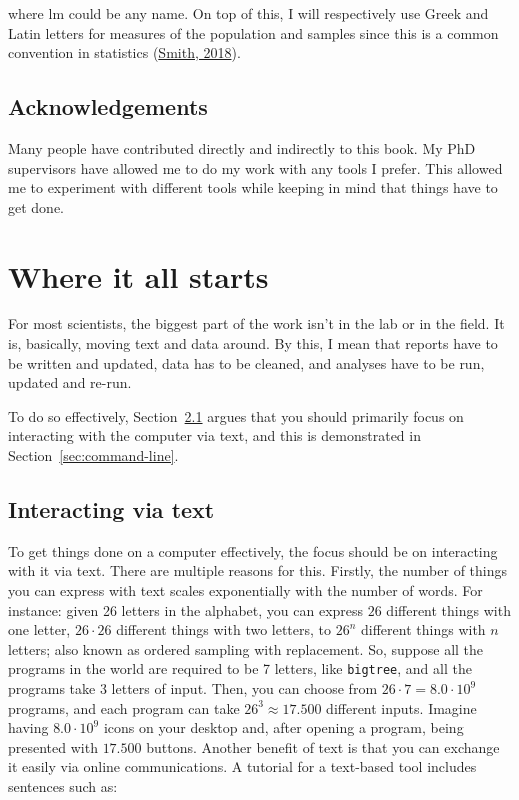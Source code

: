 \documentclass[
  14pt
  american,
  paper=a4,
  ,captions=tableheading
]{scrbook}
\newcommand{\passthrough}[1]{#1}
\begin{document}
where \(\text{lm}\) could be any name. On top of this, I will
respectively use Greek and Latin letters for measures of the population
and samples since this is a common convention in statistics
(\protect\hyperlink{ref-smith2018mathematical}{Smith, 2018}).

\hypertarget{acknowledgements}{%
\section{Acknowledgements}\label{acknowledgements}}

Many people have contributed directly and indirectly to this book. My
PhD supervisors have allowed me to do my work with any tools I prefer.
This allowed me to experiment with different tools while keeping in mind
that things have to get done.

\hypertarget{sec:start}{%
\chapter{Where it all starts}\label{sec:start}}

For most scientists, the biggest part of the work isn't in the lab or in
the field. It is, basically, moving text and data around. By this, I
mean that reports have to be written and updated, data has to be
cleaned, and analyses have to be run, updated and re-run.

To do so effectively, Section~\ref{sec:interacting} argues that you
should primarily focus on interacting with the computer via text, and
this is demonstrated in Section~\ref{sec:command-line}.

\hypertarget{sec:interacting}{%
\section{Interacting via text}\label{sec:interacting}}

To get things done on a computer effectively, the focus should be on
interacting with it via text. There are multiple reasons for this.
Firstly, the number of things you can express with text scales
exponentially with the number of words. For instance: given 26 letters
in the alphabet, you can express \(26\) different things with one
letter, \(26 \cdot 26\) different things with two letters, to \(26^n\)
different things with \(n\) letters; also known as ordered sampling with
replacement. So, suppose all the programs in the world are required to
be 7 letters, like \passthrough{\lstinline!bigtree!}, and all the
programs take 3 letters of input. Then, you can choose from
\(26 \cdot 7 = 8.0 \cdot 10^9\) programs, and each program can take
\(26^3 \approx 17.500\) different inputs. Imagine having
\(8.0 \cdot 10^9\) icons on your desktop and, after opening a program,
being presented with \(17.500\) buttons. Another benefit of text is that
you can exchange it easily via online communications. A tutorial for a
text-based tool includes sentences such as:
\end{document}
